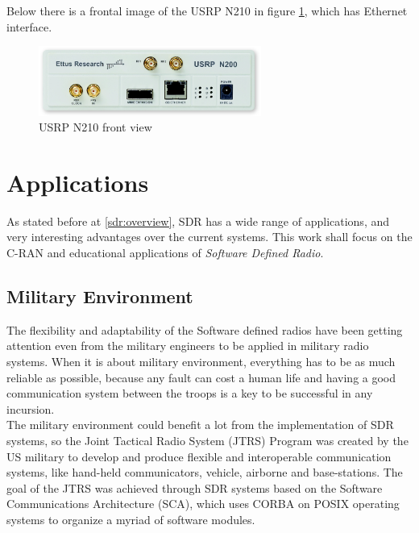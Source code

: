 Below there is a frontal image of the USRP N210 in figure \ref{fig:usrp}, which
has Ethernet interface.\\


\begin{figure}[htbp]
    \centering
    \includegraphics[width=0.65\textwidth]{./figures/usrp}
    \caption{ USRP N210 front view
    \label{fig:usrp}}
\end{figure}

\section{Applications}
\label{sec:sdr_app}

As stated before  at \ref{sdr:overview}, SDR has a wide range of applications,
and very interesting advantages over the current systems. This work shall focus
on the C-RAN and educational applications of \emph{Software Defined Radio}.

\subsection{Military Environment}

The flexibility and adaptability of the Software defined radios have been
getting attention even from the military engineers to be applied in military
radio systems. When it is about military environment, everything has to be as
much reliable as possible, because any fault can cost a human life and having a
good communication system between the troops is a key to be successful in any
incursion.\\

The military environment could benefit a lot from the implementation of SDR
systems, so the Joint Tactical Radio System (JTRS) Program was created by the US
military to develop and produce flexible and interoperable communication
systems, like hand-held communicators, vehicle, airborne and base-stations. The
goal of the JTRS was achieved through SDR systems based on the Software
Communications Architecture (SCA), which uses CORBA on POSIX operating systems
to organize a myriad of software modules.\\


